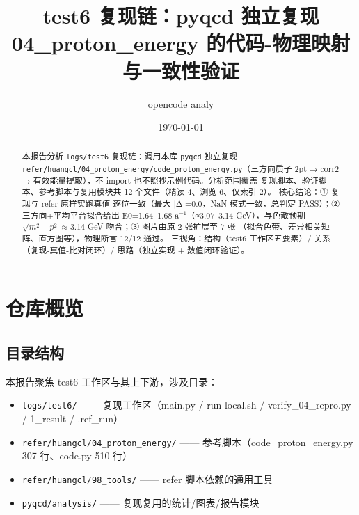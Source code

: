 \documentclass[UTF8]{ctexart}
\title{test6 复现链：pyqcd 独立复现 04\_proton\_energy 的代码-物理映射与一致性验证}
\author{opencode analy}
\date{\today}
\begin{document}
\maketitle

\begin{abstract}
本报告分析 \texttt{logs/test6} 复现链：调用本库 \texttt{pyqcd} 独立复现
\texttt{refer/huangcl/04\_proton\_energy/code\_proton\_energy.py}（三方向质子
2pt → corr2 → 有效能量提取），不 import 也不照抄示例代码。分析范围覆盖
复现脚本、验证脚本、参考脚本与复用模块共 12 个文件（精读 4、浏览 6、仅索引 2）。
核心结论：① 复现与 refer 原样实跑真值 \textcolor{evidence}{逐位一致}（最大
|Δ|=0.0，NaN 模式一致，总判定 PASS）；② 三方向+平均平台拟合给出
E0=1.64--1.68 a$^{-1}$（≈3.07--3.14 GeV），与色散预期
$\sqrt{m^2+p^2}\approx3.14$ GeV 吻合；③ 图片由原 2 张扩展至 7 张
（拟合色带、差异相关矩阵、直方图等），物理断言 12/12 通过。
三视角：结构（test6 工作区五要素）/ 关系（复现-真值-比对闭环）/
思路（独立实现 + 数值闭环验证）。
\end{abstract}

\tableofcontents

\section{仓库概览}
\subsection{目录结构}
本报告聚焦 \textcolor{struct}{test6 工作区}与其上下游，涉及目录：
\begin{itemize}
  \item \texttt{logs/test6/} —— 复现工作区（main.py / run-local.sh / verify\_04\_repro.py / 1\_result / .ref\_run）
  \item \texttt{refer/huangcl/04\_proton\_energy/} —— 参考脚本（code\_proton\_energy.py 307 行、code.py 510 行）
  \item \texttt{refer/huangcl/98\_tools/} —— refer 脚本依赖的通用工具
  \item \texttt{pyqcd/analysis/} —— 复现复用的统计/图表/报告模块
\end{itemize}
\end{document}
